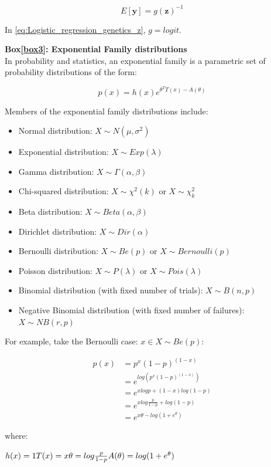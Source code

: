 \begin{equation*}
 E[\mathbf{y}] = g(\mathbf{z})^{-1} 
\end{equation*}

In \eqref{eq:Logistic_regression_genetics_z}, $ g = logit $.



\newpage

\begin{Comment}
\hspace{-2.5mm}\textbf{Box\ref{box3}: Exponential Family distributions}\label{box3}\\
In probability and statistics, an exponential family is a parametric set of probability distributions of the form:

\begin{equation*}
    p(x) = h(x)e^{\theta^TT(x)-A(\theta)}
\end{equation*}

Members of the exponential family distributions include:
\begin{itemize}
    \item Normal distribution: $X \sim N(\mu,\sigma^2)$
    \item Exponential distribution: $ X \sim Exp(\lambda)$
    \item Gamma distribution: $ X \sim \Gamma(\alpha,\beta)$
    \item Chi-squared distribution: $ X \sim \chi^2 (k)$ or $ X \sim \chi_k^2$
    \item Beta distribution: $ X \sim Beta(\alpha,\beta)$
    \item Dirichlet distribution: $ X \sim Dir(\alpha)$
    \item Bernoulli distribution: $ X \sim Be(p)$ or $ X \sim Bernoulli(p)$
    \item Poisson distribution: $ X \sim P(\lambda)$ or $ X \sim Pois(\lambda)$
    \item Binomial distribution (with fixed number of trials): $ X \sim B(n,p)$
    \item Negative Binomial distribution (with fixed number of failures): $ X \sim NB(r,p)$\\
\end{itemize}

For example, take the Bernoulli case: $x \in X \sim Be(p)$:

\begin{equation*}
\begin{split}
    p(x) & = p^x(1-p)^{(1-x)}\\
         & = e^{log(p^x(1-p)^{(1-x)})}\\
         & = e^{xlogp + (1-x)log(1-p)}\\
         & = e^{xlog\frac{p}{1-p}+log(1-p)}\\
         & = e^{x\theta - log(1+e^\theta)}
\end{split}
\end{equation*}

where: 

\hfill $h(x)=1 \hfill T(x)=x \hfill \theta = log \frac{p}{1-p} \hfill A(\theta) = log(1+e^\theta)$ \hfill

\end{Comment}

